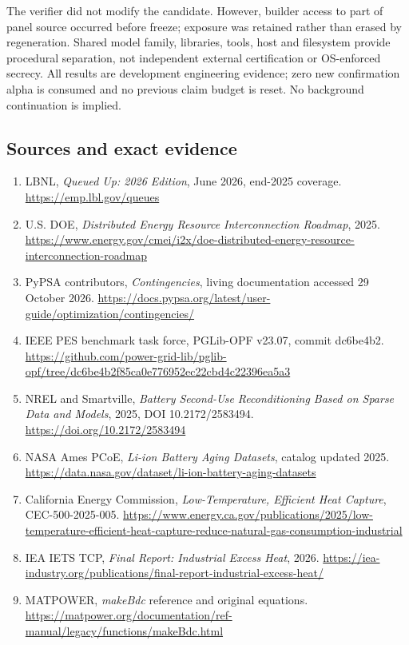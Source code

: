 \documentclass[
  10pt,
]{article}
\providecommand{\tightlist}{%
  \setlength{\itemsep}{0pt}\setlength{\parskip}{0pt}}
\begin{document}
The verifier did not modify the candidate. However, builder access to
part of panel source occurred before freeze; exposure was retained
rather than erased by regeneration. Shared model family, libraries,
tools, host and filesystem provide procedural separation, not
independent external certification or OS-enforced secrecy. All results
are development engineering evidence; zero new confirmation alpha is
consumed and no previous claim budget is reset. No background
continuation is implied.

\hypertarget{sources-and-exact-evidence}{%
\subsection{Sources and exact
evidence}\label{sources-and-exact-evidence}}

\begin{enumerate}
\def\labelenumi{\arabic{enumi}.}
\tightlist
\item
  LBNL, \emph{Queued Up: 2026 Edition}, June 2026, end-2025 coverage.
  \url{https://emp.lbl.gov/queues}
\item
  U.S. DOE, \emph{Distributed Energy Resource Interconnection Roadmap},
  2025.
  \url{https://www.energy.gov/cmei/i2x/doe-distributed-energy-resource-interconnection-roadmap}
\item
  PyPSA contributors, \emph{Contingencies}, living documentation
  accessed 29 October 2026.
  \url{https://docs.pypsa.org/latest/user-guide/optimization/contingencies/}
\item
  IEEE PES benchmark task force, PGLib-OPF v23.07, commit dc6be4b2.
  \url{https://github.com/power-grid-lib/pglib-opf/tree/dc6be4b2f85ca0e776952ec22cbd4c22396ea5a3}
\item
  NREL and Smartville, \emph{Battery Second-Use Reconditioning Based on
  Sparse Data and Models}, 2025, DOI 10.2172/2583494.
  \url{https://doi.org/10.2172/2583494}
\item
  NASA Ames PCoE, \emph{Li-ion Battery Aging Datasets}, catalog updated
  2025.
  \url{https://data.nasa.gov/dataset/li-ion-battery-aging-datasets}
\item
  California Energy Commission, \emph{Low-Temperature, Efficient Heat
  Capture}, CEC-500-2025-005.
  \url{https://www.energy.ca.gov/publications/2025/low-temperature-efficient-heat-capture-reduce-natural-gas-consumption-industrial}
\item
  IEA IETS TCP, \emph{Final Report: Industrial Excess Heat}, 2026.
  \url{https://iea-industry.org/publications/final-report-industrial-excess-heat/}
\item
  MATPOWER, \emph{makeBdc} reference and original equations.
  \url{https://matpower.org/documentation/ref-manual/legacy/functions/makeBdc.html}
\end{enumerate}
\end{document}
